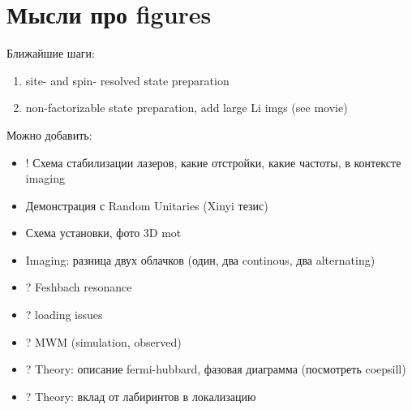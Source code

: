
\section*{Мысли про figures}


Ближайшие шаги:
\begin{enumerate}
	
	
	\item site- and spin- resolved state preparation

	\item non-factorizable state preparation, add large Li imgs (see movie)


\end{enumerate}

Можно добавить:
\begin{itemize}
	\item ! Схема стабилизации лазеров, какие отстройки, какие частоты, в контексте imaging
	\item Демонстрация с Random Unitaries (Xinyi тезис)
	\item Схема установки, фото 3D mot
	\item Imaging: разница двух облачков (один, два continous, два alternating)
	\item ? Feshbach resonance
	\item ? loading issues
	\item ? MWM (simulation, observed)
	\item ? Theory: описание fermi-hubbard, фазовая диаграмма (посмотреть coepsill)
	\item ? Theory: вклад от лабиринтов в локализацию
\end{itemize}



